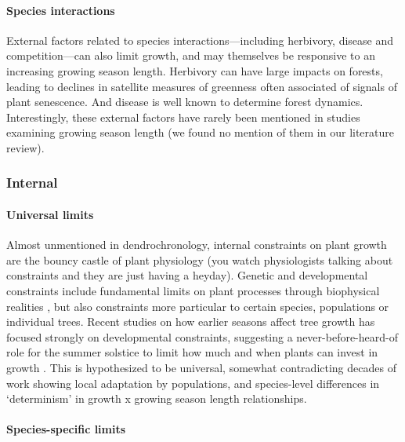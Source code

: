 \documentclass[11pt]{article}
\begin{document}
\paragraph{Species interactions} %

External factors related to species interactions---including herbivory, disease and competition---can also limit growth, and may themselves be responsive to an increasing growing season length. Herbivory can have large impacts on forests, leading to declines in satellite measures of greenness often associated of signals of plant senescence. And disease is well known to determine forest dynamics. Interestingly, these external factors have rarely been mentioned in studies examining growing season length (we found no mention of them in our literature review). 

\subsubsection*{Internal}

\paragraph{Universal limits} %

Almost unmentioned in dendrochronology, internal constraints on plant growth are the bouncy castle of plant physiology (you watch physiologists talking about constraints and they are just having a heyday). Genetic and developmental constraints include fundamental limits on plant processes through biophysical realities \citep[e.g., allometry, chemical reaction limits, and genetic architecture that may limit what trait combinations are possible,][]{ackerly2000evolution}, but also constraints more particular to certain species, populations or individual trees. Recent studies on how earlier seasons affect tree growth has focused strongly on developmental constraints, suggesting a never-before-heard-of role for the summer solstice to limit how much and when plants can invest in growth \citep{zohner2023effect}. This is hypothesized to be universal, somewhat contradicting decades of work showing local adaptation by populations, and species-level differences in `determinism' in growth x growing season length relationships. 

\paragraph{Species-specific limits}
\end{document}
